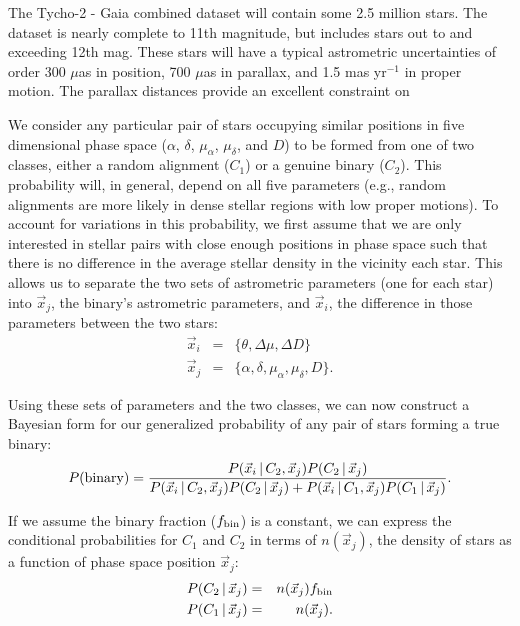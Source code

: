 \documentclass[12pt, preprint]{aastex}
\newcommand{\given}{\,|\,}
\begin{document}
The Tycho-2 - Gaia combined dataset will contain some 2.5 million stars. The dataset is nearly complete to 11th magnitude, but includes stars out to and exceeding 12th mag. These stars will have a typical astrometric uncertainties of order 300 $\mu$as in position, 700 $\mu$as in parallax, and 1.5 mas yr$^{-1}$ in proper motion. The parallax distances provide an excellent constraint on 



We consider any particular pair of stars occupying similar positions in five dimensional phase space ($\alpha$, $\delta$, $\mu_{\alpha}$, $\mu_{\delta}$, and $D$) to be formed from one of two classes, either a random alignment ($C_1$) or a genuine binary ($C_2$). This probability will, in general, depend on all five parameters (e.g., random alignments are more likely in dense stellar regions with low proper motions). To account for variations in this probability, we first assume that we are only interested in stellar pairs with close enough positions in phase space such that there is no difference in the average stellar density in the vicinity each star. This allows us to separate the two sets of astrometric parameters (one for each star) into $\vec{x}_j$, the binary's astrometric parameters, and $\vec{x}_i$, the difference in those parameters between the two stars:
\begin{eqnarray}
\vec{x}_i &=& \{\theta, \Delta \mu, \Delta D\} \\
\vec{x}_j &=& \{ \alpha, \delta, \mu_{\alpha}, \mu_{\delta}, D \}.
\end{eqnarray}

Using these sets of parameters and the two classes, we can now construct a Bayesian form for our generalized probability of any pair of stars forming a true binary:
\begin{equation}
P({\rm binary}) = \frac{P(\vec{x}_i \given C_2, \vec{x}_j) P(C_2 \given \vec{x}_j)}{P(\vec{x}_i \given C_2, \vec{x}_j) P(C_2 \given \vec{x}_j) + P(\vec{x}_i \given C_1, \vec{x}_j) P(C_1 \given \vec{x}_j)}. \label{eq:P_binary_1}
\end{equation}

If we assume the binary fraction ($f_{\rm bin}$) is a constant, we can express the conditional probabilities for $C_1$ and $C_2$ in terms of $n(\vec{x}_j)$, the density of stars as a function of phase space position $\vec{x}_j$:
\begin{eqnarray}
P(C_2 \given \vec{x}_j) &=& n(\vec{x}_j) f_{\rm bin} \\
P(C_1 \given \vec{x}_j) &=& n(\vec{x}_j).
\end{eqnarray}
\end{document}

